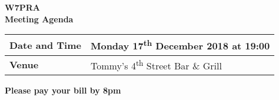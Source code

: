 \documentclass[letter,11pt]{extarticle}
\begin{document}
	\thispagestyle{empty}
	
	\begin{center}
		\textbf{W7PRA\\Meeting Agenda}
		\vspace{0.33cm}
	\end{center}
	
	\begin{center}
		\begin{tabular}{| m{3.0cm} | m{7.5cm} |} \hline
			\textbf{Date and Time} & Monday 17\textsuperscript{th} December 2018 at 19:00 \\ \hline
			\textbf{Venue} & Tommy's 4\textsuperscript{th} Street Bar \& Grill \\ \hline
				\end{tabular}
	\end{center}
	
	\begin{center}
		\textbf{Please pay your bill by 8pm}
	\end{center}
	
\end{document}
